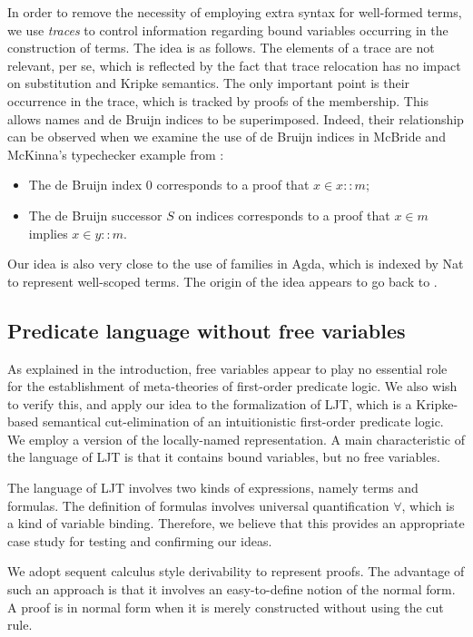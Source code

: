 \documentclass{kms-j}
\theoremstyle{plain}
\theoremstyle{remark}
\begin{document}
In order to remove the necessity of employing extra syntax
for well-formed terms,
we use \textit{traces} to control information regarding bound variables occurring in the
construction of terms.
The idea is as follows.
The elements of a trace are not relevant, per se, which is reflected by the fact that trace relocation has no impact on substitution and Kripke semantics.
The only important point is their occurrence in the trace, which is tracked by proofs of the membership.
This allows names and de Bruijn indices to be superimposed.
Indeed, their relationship can be observed when we examine the use of de Bruijn indices
in  McBride and McKinna's typechecker example from \citep[Section 7]{McBride2004}:
\begin{itemize}
\item The de Bruijn index $0$ corresponds to a proof that $x \in x :: m$;
\item The de Bruijn successor $S$ on indices corresponds to a proof that $x \in m$ implies $x \in y :: m$.
\end{itemize}
Our idea is also very close to the use of families in Agda, which is indexed by Nat to represent well-scoped terms.
The origin of the idea appears to go back to \citep{Bird1999,Bird1998,Altenkirch1999}.

\subsection{Predicate language without free variables}

As explained in the introduction, free variables appear to play no essential role
for the establishment of meta-theories of first-order predicate logic.
We also wish to verify this, and
apply our idea to the formalization of LJT, which is a Kripke-based semantical
cut-elimination of an intuitionistic first-order predicate logic.
We employ a version of the locally-named representation.
A main characteristic of the language of LJT is
that it contains bound variables, but no free variables.

The language of LJT involves two kinds of expressions, namely terms and formulas.
The definition of formulas involves universal quantification $\forall$, which is a kind of variable binding.
Therefore, we believe that this provides an appropriate case study for testing and confirming our ideas.

We adopt sequent calculus style derivability to represent proofs.
The advantage of such an approach is that it involves an easy-to-define notion of the normal form.
A proof is in normal form when it is merely constructed without using the cut rule.
\end{document}
